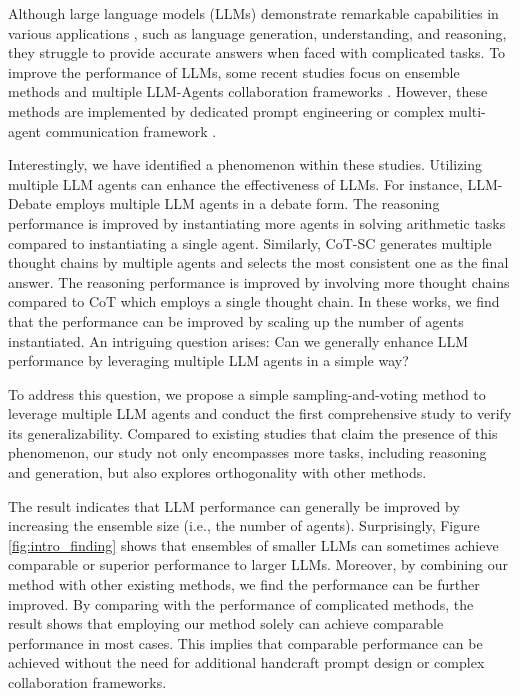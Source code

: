 
Although large language models (LLMs) demonstrate remarkable capabilities in various applications \citep{llmsurvey}, such as language generation, understanding, and reasoning, they struggle to provide accurate answers when faced with complicated tasks. To improve the performance of LLMs, some recent studies focus on ensemble methods \citep{cotsc, fusellm} and multiple LLM-Agents collaboration frameworks \citep{debate,autogen}. However, these methods are implemented by dedicated prompt engineering \citep{spp} or complex multi-agent communication framework \citep{autoagent}. 


Interestingly, we have identified a phenomenon within these studies. Utilizing multiple LLM agents can enhance the effectiveness of LLMs. For instance, LLM-Debate \cite{debate} employs multiple LLM agents in a debate form. The reasoning performance is improved by instantiating more agents in solving arithmetic tasks compared to instantiating a single agent. Similarly, CoT-SC \citep{cotsc} generates multiple thought chains by multiple agents and selects the most consistent one as the final answer. The reasoning performance is improved by involving more thought chains compared to CoT \cite{cot} which employs a single thought chain. In these works, we find that the performance can be improved by scaling up the number of agents instantiated. An intriguing question arises: Can we generally enhance LLM performance by leveraging multiple LLM agents in a simple way?


To address this question, we propose a simple sampling-and-voting method to leverage multiple LLM agents and conduct the first comprehensive study to verify its generalizability. Compared to existing studies \cite{cotsc,complexity-cot,debate} that claim the presence of this phenomenon, our study not only encompasses more tasks, including reasoning and generation, but also explores orthogonality with other methods. 

The result indicates that LLM performance can generally be improved by increasing the ensemble size (i.e., the number of agents). Surprisingly, Figure \ref{fig:intro_finding} shows that ensembles of smaller LLMs can sometimes achieve comparable or superior performance to larger LLMs. Moreover, by combining our method with other existing methods, we find the performance can be further improved. By comparing with the performance of complicated methods, the result shows that employing our method solely can achieve comparable performance in most cases. This implies that comparable performance can be achieved without the need for additional handcraft prompt design or complex collaboration frameworks.

